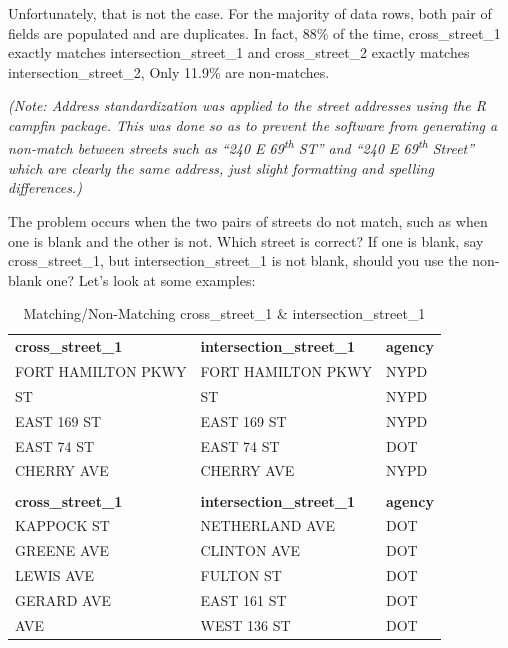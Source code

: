 \documentclass[12pt, titlepage]{article}
\begin{document}
{Unfortunately, that is not the case. For the majority of data rows, both pair of fields are populated and are duplicates.
In fact, 88\% of the time, cross\_street\_1 exactly matches intersection\_street\_1 and 
cross\_street\_2 exactly matches intersection\_street\_2, Only 11.9\% are non-matches.

\textit{(Note: Address standardization was applied to the street addresses using the R \emph{campfin} package. 
This was done so as to prevent the software from generating a non-match between 
streets such as ``240 E 69\textsuperscript{th} ST'' and ``240 E 69\textsuperscript{th} Street'' 
which are clearly the same address, just slight formatting and spelling differences.)}

The problem occurs when the two pairs of streets do not match, such as when one is blank and the
other is not. Which street is correct? If one is blank, say cross\_street\_1, but  intersection\_street\_1
is not blank, should you use the non-blank one?  Let's look at some examples:

\begin{table}[H]
    \centering
    \footnotesize
    \begin{tabular}{>{\small\ttfamily}l >{\small\ttfamily}l >{\small\ttfamily}l}
        \toprule
        \multicolumn{3}{c}{\textbf{Matching cross\_street\_1 and intersection\_street\_1}} \\
        \midrule
        \textbf{cross\_street\_1} & \textbf{intersection\_street\_1} & \textbf{agency} \\
        \midrule
        FORT HAMILTON PKWY & FORT HAMILTON PKWY & NYPD \\
        87 ST              & 87 ST              & NYPD \\
        EAST 169 ST        & EAST 169 ST        & NYPD \\
        EAST 74 ST         & EAST 74 ST         & DOT  \\
        CHERRY AVE         & CHERRY AVE         & NYPD \\
        \midrule
        \multicolumn{3}{c}{\textbf{Non-matching cross\_street\_1 and intersection\_street\_1}} \\
        \midrule
        \textbf{cross\_street\_1} & \textbf{intersection\_street\_1} & \textbf{agency} \\
        \midrule
        KAPPOCK ST     & NETHERLAND AVE   & DOT \\
        GREENE AVE     & CLINTON AVE      & DOT \\
        LEWIS AVE      & FULTON ST        & DOT \\
        GERARD AVE     & EAST 161 ST      & DOT \\
        8 AVE          & WEST 136 ST      & DOT \\
        \bottomrule
    \end{tabular}
    \caption{Matching/Non-Matching cross\_street\_1 \& intersection\_street\_1}
    \label{tab:streets1}
\end{table}

}
\end{document}

